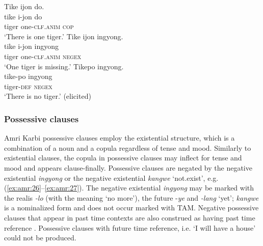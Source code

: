 \documentclass[output=paper,colorlinks,citecolor=brown]{langscibook}
\begin{document}
\ea\label{ex:amr:25}
    \ea\label{ex:amr:25a} Tike ijon do.  \\ 
        \gll tike i-jon do \\
              tiger one-\textsc{clf}.\textsc{anim} \textsc{cop} \\
        \glt  ‘There is one tiger.’ 
    \ex\label{ex:amr:25b}Tike ijon ingyong.  \\
        \gll tike i-jon ingyong\\
              tiger one-\textsc{clf}.\textsc{anim} \textsc{negex}\\
        \glt ‘One tiger is missing.’
\newpage
    \ex\label{ex:amr:25c}Tikepo ingyong. \\
        \gll tike-po ingyong\\
              tiger-\textsc{def} \textsc{negex}\\
        \glt ‘There is no tiger.’ (elicited)
    \z
\z 


\subsubsection{Possessive clauses}\label{sec:amr:2.3.4}
Amri Karbi possessive clauses employ the existential structure, which is a combination of a noun and a copula regardless of tense and mood. Similarly to existential clauses, the copula in possessive clauses may inflect for tense and mood and appears clause-finally. Possessive clauses are negated by the negative existential \textit{ingyong} or the negative existential \textit{kangwe} ‘not.exist’, e.g. (\ref{ex:amr:26}--\ref{ex:amr:27}). The negative existential \textit{ingyong} may be marked with the realis \textit{{}-lo} (with the meaning ‘no more’), the future -\textit{ye} and \textit{{}-lang} ‘yet’; \textit{kangwe} is a nominalized form and does not occur marked with TAM. Negative possessive clauses that appear in past time contexts are also construed as having past time reference . Possessive clauses with future time reference, i.e. ‘I will have a house’ could not be produced.
\end{document}

